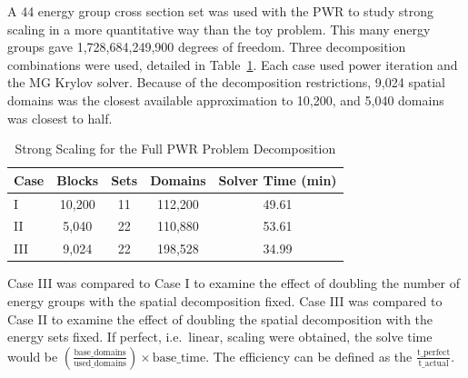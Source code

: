 A 44 energy group cross section set was used with the PWR to study strong scaling in a more quantitative way than the toy problem. This many energy groups gave 1,728,684,249,900 degrees of freedom. Three decomposition combinations were used, detailed in Table~\ref{table:StrongCasesPWR}. Each case used power iteration and the MG Krylov solver. Because of the decomposition restrictions, 9,024 spatial domains was the closest available approximation to 10,200, and 5,040 domains was closest to half.
%
\begin{table}[!h]
\caption{Strong Scaling for the Full PWR Problem Decomposition}
\begin{center}
\begin{tabular}{l c c c c}
\hline
Case & Blocks & Sets & Domains & Solver Time (min) \\[0.5ex]
\hline
I   & 10,200 & 11 & 112,200 & 49.61 \\
II  & 5,040   & 22 & 110,880 & 53.61 \\
III & 9,024   & 22 & 198,528 & 34.99 \\
\hline
\end{tabular}
\end{center}
\label{table:StrongCasesPWR}
\end{table}

Case III was compared to Case I to examine the effect of doubling the number of energy groups with the spatial decomposition fixed. Case III was compared to Case II to examine the effect of doubling the spatial decomposition with the energy sets fixed. If perfect, i.e.\ linear, scaling were obtained, the solve time would be $(\frac{\text{base\_domains}}{\text{used\_domains}}) \times \text{base\_time}$. The efficiency can be defined as the $\frac{\text{t\_perfect}}{\text{t\_actual}}$. 

